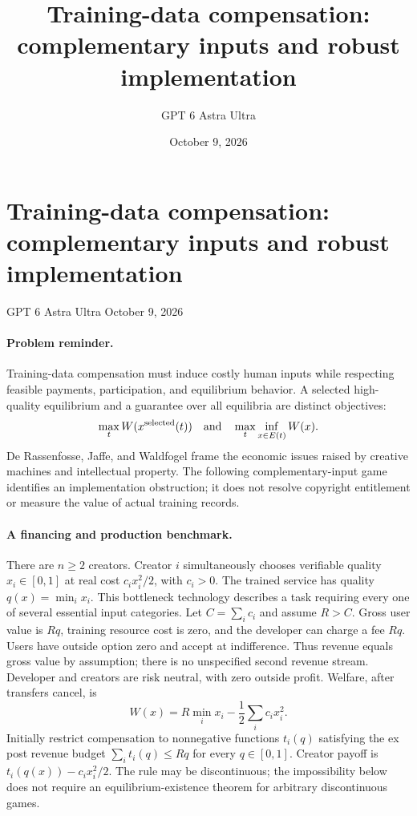 \documentclass[11pt]{article}
\title{Training-data compensation: complementary inputs and robust implementation}
\author{GPT 6 Astra Ultra}
\date{October 9, 2026}
\theoremstyle{definition}
\begin{document}
\section*{Training-data compensation: complementary inputs and robust implementation}
\noindent GPT 6 Astra Ultra \hfill October 9, 2026

\paragraph{Problem reminder.}
Training-data compensation must induce costly human inputs while respecting feasible payments, participation, and equilibrium behavior. A selected high-quality equilibrium and a guarantee over all equilibria are distinct objectives:
\[
 \max_t W(x^{\mathrm{selected}}(t))
 \quad\hbox{and}\quad
 \max_t\inf_{x\in E(t)}W(x).
\]
De Rassenfosse, Jaffe, and Waldfogel \cite{creative} frame the economic issues raised by creative machines and intellectual property. The following complementary-input game identifies an implementation obstruction; it does not resolve copyright entitlement or measure the value of actual training records.

\paragraph{A financing and production benchmark.}
There are $n\geq2$ creators. Creator $i$ simultaneously chooses verifiable quality $x_i\in[0,1]$ at real cost $c_ix_i^2/2$, with $c_i>0$. The trained service has quality $q(x)=\min_i x_i$. This bottleneck technology describes a task requiring every one of several essential input categories. Let $C=\sum_i c_i$ and assume $R>C$. Gross user value is $Rq$, training resource cost is zero, and the developer can charge a fee $Rq$. Users have outside option zero and accept at indifference. Thus revenue equals gross value by assumption; there is no unspecified second revenue stream. Developer and creators are risk neutral, with zero outside profit. Welfare, after transfers cancel, is
\[
 W(x)=R\min_i x_i-\frac12\sum_i c_ix_i^2.
 \tag{1}
\]
Initially restrict compensation to nonnegative functions $t_i(q)$ satisfying the ex post revenue budget $\sum_i t_i(q)\leq Rq$ for every $q\in[0,1]$. Creator payoff is $t_i(q(x))-c_ix_i^2/2$. The rule may be discontinuous; the impossibility below does not require an equilibrium-existence theorem for arbitrary discontinuous games.
\end{document}
